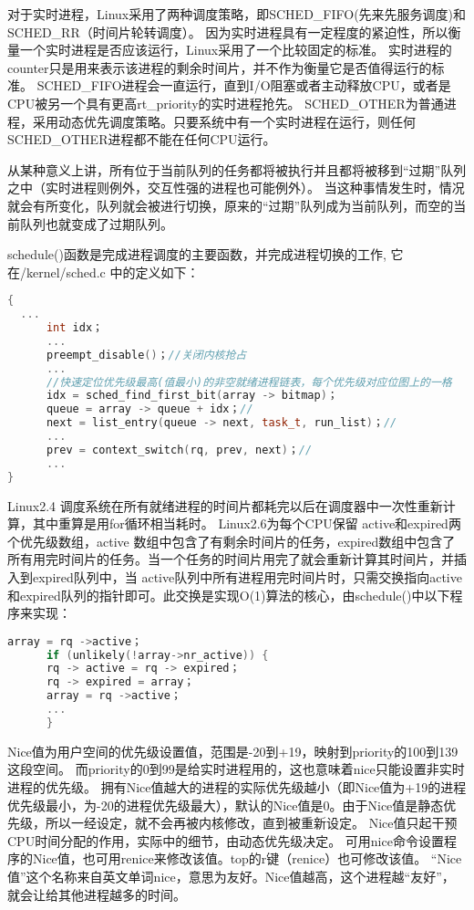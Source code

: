 对于实时进程，Linux采用了两种调度策略，即SCHED\_FIFO(先来先服务调度)和SCHED\_RR（时间片轮转调度）。
因为实时进程具有一定程度的紧迫性，所以衡量一个实时进程是否应该运行，Linux采用了一个比较固定的标准。
实时进程的counter只是用来表示该进程的剩余时间片，并不作为衡量它是否值得运行的标准。
SCHED\_FIFO进程会一直运行，直到I/O阻塞或者主动释放CPU，或者是CPU被另一个具有更高rt\_priority的实时进程抢先。
SCHED\_OTHER为普通进程，采用动态优先调度策略。只要系统中有一个实时进程在运行，则任何SCHED\_OTHER进程都不能在任何CPU运行。
 
从某种意义上讲，所有位于当前队列的任务都将被执行并且都将被移到“过期”队列之中（实时进程则例外，交互性强的进程也可能例外）。
当这种事情发生时，情况就会有所变化，队列就会被进行切换，原来的“过期”队列成为当前队列，而空的当前队列也就变成了过期队列。

schedule()函数是完成进程调度的主要函数，并完成进程切换的工作,
它在/kernel/sched.c 中的定义如下：
\begin{lstlisting}[language=C++]
{
  ...
      int idx；
      ...
      preempt_disable()；//关闭内核抢占
      ...
      //快速定位优先级最高(值最小)的非空就绪进程链表，每个优先级对应位图上的一格
      idx = sched_find_first_bit(array -> bitmap)；
      queue = array -> queue + idx；//
      next = list_entry(queue -> next, task_t, run_list)；//
      ...
      prev = context_switch(rq, prev, next)；//
      ...
}
\end{lstlisting}
Linux2.4 调度系统在所有就绪进程的时间片都耗完以后在调度器中一次性重新计算，其中重算是用for循环相当耗时。
Linux2.6为每个CPU保留 active和expired两个优先级数组，active 数组中包含了有剩余时间片的任务，expired数组中包含了所有用完时间片的任务。当一个任务的时间片用完了就会重新计算其时间片，并插入到expired队列中，当 active队列中所有进程用完时间片时，只需交换指向active和expired队列的指针即可。此交换是实现O(1)算法的核心，由schedule()中以下程序来实现：
\begin{lstlisting}[language=C++]
      array = rq ->active；
      if (unlikely(!array->nr_active)) {
	  rq -> active = rq -> expired；
	  rq -> expired = array；
	  array = rq ->active；
	  ...
      }
\end{lstlisting}



Nice值为用户空间的优先级设置值，范围是-20到+19，映射到priority的100到139这段空间。
而priority的0到99是给实时进程用的，这也意味着nice只能设置非实时进程的优先级。
拥有Nice值越大的进程的实际优先级越小（即Nice值为+19的进程优先级最小，为-20的进程优先级最大），默认的Nice值是0。由于Nice值是静态优先级，所以一经设定，就不会再被内核修改，直到被重新设定。
Nice值只起干预CPU时间分配的作用，实际中的细节，由动态优先级决定。
可用nice命令设置程序的Nice值，也可用renice来修改该值。top的r键（renice）也可修改该值。
“Nice值”这个名称来自英文单词nice，意思为友好。Nice值越高，这个进程越“友好”，就会让给其他进程越多的时间。


